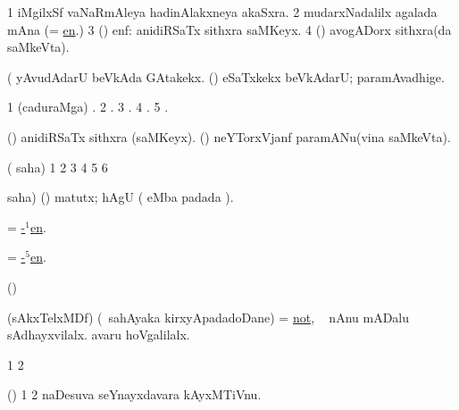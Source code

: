 \bentry
{}
\gl{\nA}
\bmng
\bnum
\num{1} iMgilxSf vaNaRmAleya hadinAlakxneya akaSxra. 
\num{2} mudarxNadalilx agalada mAna (= \hyperref{kandict_e.pdf}{E}{en}{en}.) 
\num{3} (\biVga) enf:  anidiRSaTx sithxra saMKeyx. 
\num{4} (\Bwvi) avogADorx sithxra(da saMkeVta). 
\enum
\emng

\noindent
\gl{\pagu}
\expl{}
\bmng
{} (  
\banum
{} yAvudAdarU beVkAda GAtakekx. 
 (\rUpa) eSaTxkekx beVkAdarU; paramAvadhige. 
\eanum
\emng
\eentry

\bentry
{}
\pron{}
\gl{\saMkiSx}
\bmng
\bnum
\num{1} (caduraMga) . 
\num{2} . 
\num{3} . 
\num{4} . 
\num{5} . 
\enum
\emng
\eentry

\bentry
{}
\pron{}
\gl{\saMkeV}
\bmng
\banum
{} (\biVga) anidiRSaTx sithxra (saMKeyx). 
 (\ravi) neYTorxVjanf paramANu(vina saMkeVta). 
\eanum
\emng
\eentry

\bentry
{}
\gl{\saMkiSx}
\bmng
 ( saha) 
\bnum
\num{1}  
\num{2}  
\num{3}  
\num{4}  
\num{5}  
\num{6}  
\enum
\emng
\eentry

\bentry
{}
\pron{}
\gl{\saMavayx}
\bmng
  saha) (\AmA) matutx; hAgU ( eMba padada \saMkiSx). 
\emng
\eentry

\bentry
{}
\pron{}
\gl{\uparx}
\bmng
= \hyperref{kandict_e.pdf}{E}{hyp-en(1)}{-$^1$en}.
\emng
\eentry

\bentry
{}
\pron{}
\gl{\uparx}
\bmng
= \hyperref{kandict_e.pdf}{E}{hyp-en(5)}{-$^5$en}. 
\emng
\eentry

\bentry
{}
\gl{\saMkeV}
\bmng
(\ravi)  
\emng
\eentry

\bentry
{}
\gl{\kirxvi}
\bmng
 (sAkxTelxMDf) (\sA\ sahAyaka kirxyApadadoDane) = \hyperlink{not}{not}, \udA\  nAnu mADalu sAdhayxvilalx.  avaru hoVgalilalx. 
\emng
\eentry

\bentry
{}
\gl{\saMkiSx}
\bmng
\bnum
\num{1}  
\num{2}  
\enum
\emng
\eentry

\bentry
{}
\gl{\saMkiSx}
\bmng
(\birx) 
\bnum
\num{1}  
\num{2}  naDesuva seYnayxdavara kAyxMTiVnu. 
\enum
\emng
\eentry

